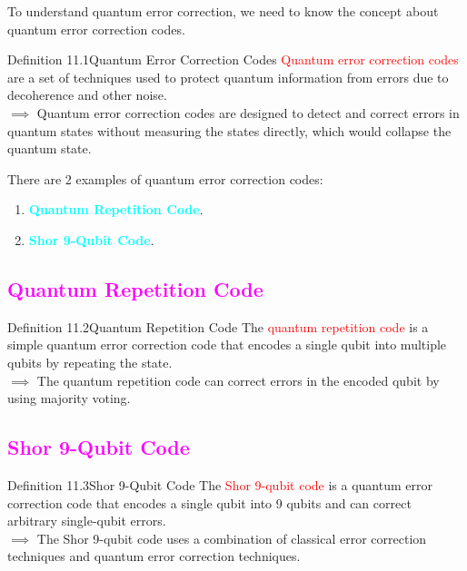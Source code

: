 \documentclass{book}
\begin{document}
To understand quantum error correction, we need to know the concept about quantum error correction codes.\\
\begin{defBox}{Definition 11.1}{Quantum Error Correction Codes}
    \textcolor{red}{Quantum error correction codes} are a set of techniques used to protect quantum information from errors due to decoherence and other noise.\\
    $\implies$ Quantum error correction codes are designed to detect and correct errors in quantum states without measuring the states directly, which would collapse the quantum state.
\end{defBox}
There are 2 examples of quantum error correction codes:
\begin{enumerate}
    \item \textcolor{cyan}{\textbf{Quantum Repetition Code}}.
    \item \textcolor{cyan}{\textbf{Shor 9-Qubit Code}}.
\end{enumerate}



\textcolor{magenta}{\section{\textbf{Quantum Repetition Code}}}
\begin{defBox}{Definition 11.2}{Quantum Repetition Code}
    The \textcolor{red}{quantum repetition code} is a simple quantum error correction code that encodes a single qubit into multiple qubits by repeating the state.\\
    $\implies$ The quantum repetition code can correct errors in the encoded qubit by using majority voting.
\end{defBox}






\textcolor{magenta}{\section{\textbf{Shor 9-Qubit Code}}}
\begin{defBox}{Definition 11.3}{Shor 9-Qubit Code}
    The \textcolor{red}{Shor 9-qubit code} is a quantum error correction code that encodes a single qubit into 9 qubits and can correct arbitrary single-qubit errors.\\
    $\implies$ The Shor 9-qubit code uses a combination of classical error correction techniques and quantum error correction techniques.
\end{defBox}
\end{document}
